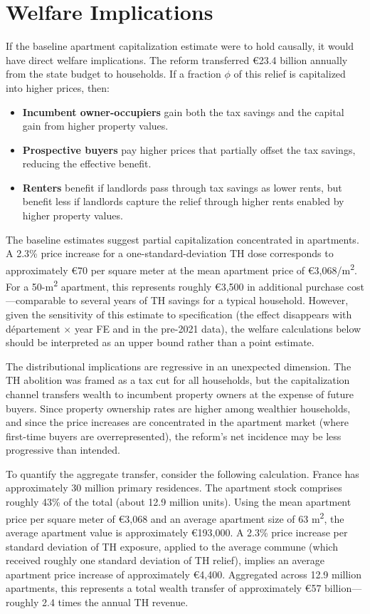 \documentclass[12pt]{article}
\begin{document}
\section{Welfare Implications}

If the baseline apartment capitalization estimate were to hold causally, it would have direct welfare implications. The reform transferred \euro{}23.4 billion annually from the state budget to households. If a fraction $\phi$ of this relief is capitalized into higher prices, then:

\begin{itemize}
    \item \textbf{Incumbent owner-occupiers} gain both the tax savings and the capital gain from higher property values.
    \item \textbf{Prospective buyers} pay higher prices that partially offset the tax savings, reducing the effective benefit.
    \item \textbf{Renters} benefit if landlords pass through tax savings as lower rents, but benefit less if landlords capture the relief through higher rents enabled by higher property values.
\end{itemize}

The baseline estimates suggest partial capitalization concentrated in apartments. A 2.3\% price increase for a one-standard-deviation TH dose corresponds to approximately \euro{}70 per square meter at the mean apartment price of \euro{}3,068/m\textsuperscript{2}. For a 50-m\textsuperscript{2} apartment, this represents roughly \euro{}3,500 in additional purchase cost---comparable to several years of TH savings for a typical household. However, given the sensitivity of this estimate to specification (the effect disappears with d\'{e}partement $\times$ year FE and in the pre-2021 data), the welfare calculations below should be interpreted as an upper bound rather than a point estimate.

The distributional implications are regressive in an unexpected dimension. The TH abolition was framed as a tax cut for all households, but the capitalization channel transfers wealth to incumbent property owners at the expense of future buyers. Since property ownership rates are higher among wealthier households, and since the price increases are concentrated in the apartment market (where first-time buyers are overrepresented), the reform's net incidence may be less progressive than intended.

To quantify the aggregate transfer, consider the following calculation. France has approximately 30 million primary residences. The apartment stock comprises roughly 43\% of the total (about 12.9 million units). Using the mean apartment price per square meter of \euro{}3,068 and an average apartment size of 63 m\textsuperscript{2}, the average apartment value is approximately \euro{}193,000. A 2.3\% price increase per standard deviation of TH exposure, applied to the average commune (which received roughly one standard deviation of TH relief), implies an average apartment price increase of approximately \euro{}4,400. Aggregated across 12.9 million apartments, this represents a total wealth transfer of approximately \euro{}57 billion---roughly 2.4 times the annual TH revenue.
\end{document}

